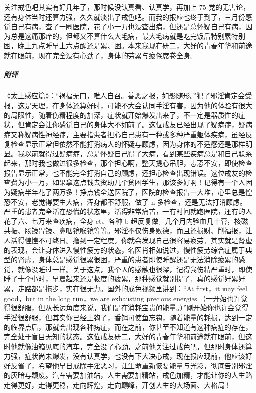 \begin{case}
    关注戒色吧其实有好几年了，那时候没认真看、认真学，再加上 75 党的无害论，还有身体当时还算力强，久久就淡出了戒色吧。而我的报应也终于到了，三月份感觉自己有病，查了一圈医院，花了小一万也没查出病，但还是总怀疑自己有病，因为总是这痛那痒的，但都又不算什么大毛病，最大毛病就是吃完饭后特别累特别困，晚上九点睡早上六点醒还是累、困。本来我现在研二，大好的青春年华和前途就在眼前，现在完全没有心劲了，身体的劳累与疲倦席卷全身。
    \subparagraph{附评} 《太上感应篇》：“祸福无门，唯人自召。善恶之报，如影随形。”犯了邪淫肯定会受报，这是天理，在身体还算好时，可能不大会认同手淫有害，因为他的体验有很大的局限性，随着伤精程度的加深，症状就开始爆发出来了，不一定是器质性的症状，但肯定会让你感觉自己的身体大不如前了。这位戒友已经出现了疑病症，疑病症又称疑病性神经症，主要指患者担心自己患有一种或多种严重躯体疾病，虽经反复检查显示正常但依然不能打消病人的怀疑与顾虑，因为身体的不适感还是那样明显。我以前就得过疑病症，总是怀疑自己得了大病，看到某些疾病总是和自己联系起来，那时我也做过很多检查，那个担心啊，整天提心吊胆，忐忑不安，即使检查报告显示正常，也不能完全打消自己的顾虑，还担心检查出现错误。这位戒友的检查费为小一万，如果拿这点钱去资助几个贫困学生，那该多好啊！记得有一个人因为疑病半年花了两万多！挣点钱全送医院了，医院的检查报告一大堆，心里总是惶恐不安，老觉得要生大病，浑身都不舒服，做了 n 多检查，还是无法打消顾虑。严重的患者完全活在恐慌的状态里，活得非常痛苦，一有时间就跑医院，还有的人花了六、七万来查疾病，全身 ct、各种 b 超反复做，几个月内验血几十管，核磁共振、肠镜胃镜、鼻咽镜喉镜等等。邪淫不仅伤身败德，而且还损财、削福报，让人活得惶惶不可终日。撸到一定程度，你就会发现自己很容易疲劳，其实就是肾虚的表现，会让身体进入慢性疲劳的状态，名医肖相如说过，慢性疲劳综合症属于典型的肾虚。身体总是感觉很累很困，严重的患者即使睡醒还是无法消除疲累的感觉，就像没睡过一样。关于这点，我个人的感触也很深，记得我伤精严重时，即使睡了十个小时，早晨起来还是极度的疲累，那种感觉就别提了，真的感觉好累好累，走路都是拖步，实在很无力。国外的戒色视频里讲到：“At first，it may feel good，but in the long run，we are exhausting precious energies.（一开始也许觉得很舒服，但从长远角度来说，我们是在消耗宝贵的能量。）”刚开始你也许会觉得手淫很舒服，但其实你已经上钩了，香饵可使鱼忘钩，随着能量的耗损，达到一定的临界点后，那就会出现各种病症，而在之前，你甚至不知道有这种病症的存在，完全处于盲目无知的状态。这位戒友研二，大好的青春年华和前途就在眼前，但这时他就像油箱见底的汽车，完全没了心劲，之前他关注过戒色吧，但那时身体还算力强，症状尚未爆发，没有认真学，也没有下大决心戒，现在报应现前，他应该好好反省了，希望他早日戒除手淫恶习，让生命重新恢复能量与光彩，彻底告别邪淫的灰暗与颓废。汽车需要加油站，人生需要加精站，戒色加精，才能让你的人生路走得更好，走得更稳，走向辉煌，走向巅峰，开创人生的大场面、大格局！
\end{case}

